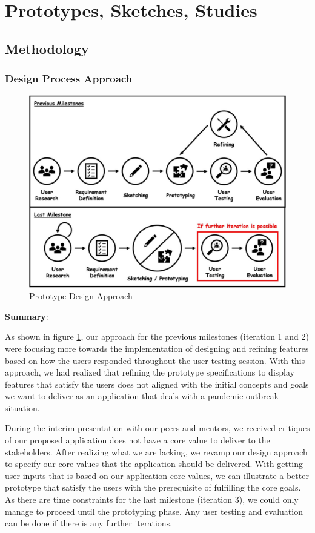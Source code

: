 \section{Prototypes, Sketches, Studies}

  \subsection{Methodology}
  
    \subsubsection{Design Process Approach}
      \begin{figure}[H]
        \centering
        \includegraphics[width=\textwidth]{img/prototype/prototype-1.JPG}
        \caption{Prototype Design Approach}
        \label{fig:design-approach}
      \end{figure}
      \par \textbf{Summary}:
      \par As shown in figure \ref{fig:design-approach}, our approach for the previous milestones (iteration 1 and 2) were focusing
      more towards the implementation of designing and refining features based on how the users
      responded throughout the user testing session. With this approach, we had realized that refining the
      prototype specifications to display features that satisfy the users does not aligned with the initial
      concepts and goals we want to deliver as an application that deals with a pandemic outbreak situation.
      \par During the interim presentation with our peers and mentors, we received critiques of our proposed
      application does not have a core value to deliver to the stakeholders. After realizing what we are
      lacking, we revamp our design approach to specify our core values that the application should be
      delivered. With getting user inputs that is based on our application core values, we can illustrate a
      better prototype that satisfy the users with the prerequisite of fulfilling the core goals. As there are
      time constraints for the last milestone (iteration 3), we could only manage to proceed until the
      prototyping phase. Any user testing and evaluation can be done if there is any further iterations.

